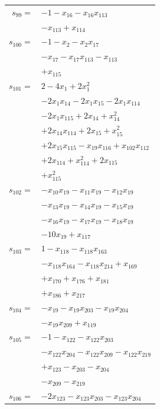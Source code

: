 \begin{longtable}{@{}r@{\;}l@{}}
\(s_{99}=\) & \(\displaystyle -1 -x_{16} -x_{16}x_{113}\) \\
 & \(\displaystyle -x_{113} +x_{114}\) \\[3pt]
\(s_{100}=\) & \(\displaystyle -1 -x_{2} -x_{2}x_{17}\) \\
 & \(\displaystyle -x_{17} -x_{17}x_{113} -x_{113}\) \\
 & \(\displaystyle +x_{115}\) \\[3pt]
\(s_{101}=\) & \(\displaystyle 2 -4x_{1} +2x_{1}^{2}\) \\
 & \(\displaystyle -2x_{1}x_{14} -2x_{1}x_{15} -2x_{1}x_{114}\) \\
 & \(\displaystyle -2x_{1}x_{115} +2x_{14} +x_{14}^{2}\) \\
 & \(\displaystyle +2x_{14}x_{114} +2x_{15} +x_{15}^{2}\) \\
 & \(\displaystyle +2x_{15}x_{115} -x_{19}x_{116} +x_{102}x_{112}\) \\
 & \(\displaystyle +2x_{114} +x_{114}^{2} +2x_{115}\) \\
 & \(\displaystyle +x_{115}^{2}\) \\[3pt]
\(s_{102}=\) & \(\displaystyle -x_{10}x_{19} -x_{11}x_{19} -x_{12}x_{19}\) \\
 & \(\displaystyle -x_{13}x_{19} -x_{14}x_{19} -x_{15}x_{19}\) \\
 & \(\displaystyle -x_{16}x_{19} -x_{17}x_{19} -x_{18}x_{19}\) \\
 & \(\displaystyle -10x_{19} +x_{117}\) \\[3pt]
\(s_{103}=\) & \(\displaystyle 1 -x_{118} -x_{118}x_{163}\) \\
 & \(\displaystyle -x_{118}x_{164} -x_{118}x_{214} +x_{169}\) \\
 & \(\displaystyle +x_{170} +x_{176} +x_{181}\) \\
 & \(\displaystyle +x_{186} +x_{217}\) \\[3pt]
\(s_{104}=\) & \(\displaystyle -x_{19} -x_{19}x_{203} -x_{19}x_{204}\) \\
 & \(\displaystyle -x_{19}x_{209} +x_{119}\) \\[3pt]
\(s_{105}=\) & \(\displaystyle -1 -x_{122} -x_{122}x_{203}\) \\
 & \(\displaystyle -x_{122}x_{204} -x_{122}x_{209} -x_{122}x_{219}\) \\
 & \(\displaystyle +x_{123} -x_{203} -x_{204}\) \\
 & \(\displaystyle -x_{209} -x_{219}\) \\[3pt]
\(s_{106}=\) & \(\displaystyle -2x_{123} -x_{123}x_{203} -x_{123}x_{204}\) \\

\end{longtable}

